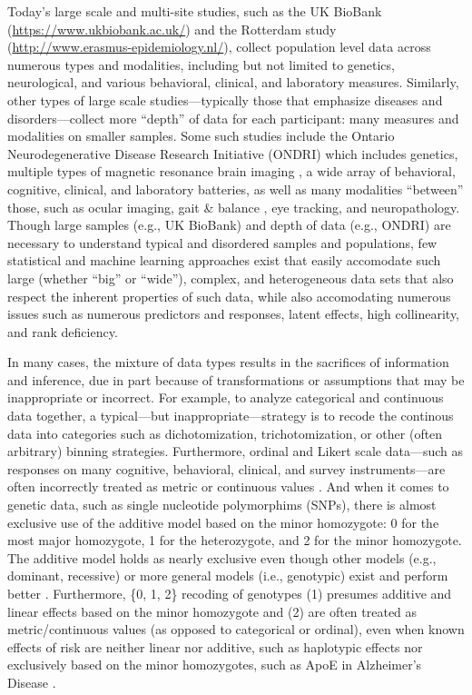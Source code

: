 \documentclass[12pt]{article}
\begin{document}
Today's large scale and multi-site studies, such as the UK BioBank
(\url{https://www.ukbiobank.ac.uk/}) and the Rotterdam study
(\url{http://www.erasmus-epidemiology.nl/}), collect population level
data across numerous types and modalities, including but not limited to
genetics, neurological, and various behavioral, clinical, and laboratory
measures. Similarly, other types of large scale studies---typically
those that emphasize diseases and disorders---collect more ``depth'' of
data for each participant: many measures and modalities on smaller
samples. Some such studies include the Ontario Neurodegenerative Disease
Research Initiative (ONDRI) \citep{farhan_ontario_2016} which includes
genetics, multiple types of magnetic resonance brain imaging
\citep{duchesne_canadian_2019}, a wide array of behavioral, cognitive,
clinical, and laboratory batteries, as well as many modalities
``between'' those, such as ocular imaging, gait \& balance
\citep{montero-odasso_motor_2017-1}, eye tracking, and neuropathology.
Though large samples (e.g., UK BioBank) and depth of data (e.g., ONDRI)
are necessary to understand typical and disordered samples and
populations, few statistical and machine learning approaches exist that
easily accomodate such large (whether ``big'' or ``wide''), complex, and
heterogeneous data sets that also respect the inherent properties of
such data, while also accomodating numerous issues such as numerous
predictors and responses, latent effects, high collinearity, and rank
deficiency.

In many cases, the mixture of data types results in the sacrifices of
information and inference, due in part because of transformations or
assumptions that may be inappropriate or incorrect. For example, to
analyze categorical and continuous data together, a typical---but
inappropriate---strategy is to recode the continous data into categories
such as dichotomization, trichotomization, or other (often arbitrary)
binning strategies. Furthermore, ordinal and Likert scale data---such as
responses on many cognitive, behavioral, clinical, and survey
instruments---are often incorrectly treated as metric or continuous
values \citep{burkner_ordinal_nodate}. And when it comes to genetic
data, such as single nucleotide polymorphims (SNPs), there is almost
exclusive use of the additive model based on the minor homozygote: 0 for
the most major homozygote, 1 for the heterozygote, and 2 for the minor
homozygote. The additive model holds as nearly exclusive even though
other models (e.g., dominant, recessive) or more general models (i.e.,
genotypic) exist and perform better \citep{lettre2007genetic}.
Furthermore, \{0, 1, 2\} recoding of genotypes (1) presumes additive and
linear effects based on the minor homozygote and (2) are often treated
as metric/continuous values (as opposed to categorical or ordinal), even
when known effects of risk are neither linear nor additive, such as
haplotypic effects \citep{vormfelde_value_2007} nor exclusively based on
the minor homozygotes, such as ApoE in Alzheimer's Disease
\citep{genin_apoe_2011}.
\end{document}
